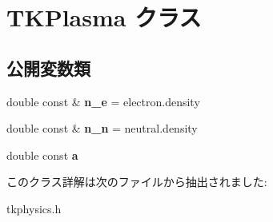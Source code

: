\hypertarget{class_t_k_plasma}{}\section{T\+K\+Plasma クラス}
\label{class_t_k_plasma}
\subsection*{公開変数類}
\begin{DoxyCompactItemize}
\item 
\mbox{\label{class_t_k_plasma_ab2ba31fba9c3b255fa454d557b46c552}} 
double const  \& {\bfseries n\+\_\+e} = electron.\+density
\item 
\mbox{\label{class_t_k_plasma_af742f3b64a9c48f6f0e3184bf7ebb0c2}} 
double const  \& {\bfseries n\+\_\+n} = neutral.\+density
\item 
\mbox{\label{class_t_k_plasma_a0074fb0c178f69de84d5509d0bfd4ac0}} 
double const {\bfseries a}
\end{DoxyCompactItemize}


このクラス詳解は次のファイルから抽出されました\+:\begin{DoxyCompactItemize}
\item 
tkphysics.\+h\end{DoxyCompactItemize}
